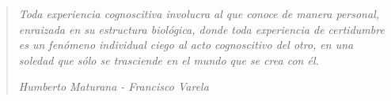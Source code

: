 \thispagestyle{empty}
\vspace*{\fill}
\begin{quote}
	\raggedleft
	\emph{Toda experiencia cognoscitiva involucra al que conoce de manera personal, enraizada en su estructura biológica, donde toda experiencia de certidumbre es un fenómeno individual ciego al acto cognoscitivo del otro, en una soledad que sólo se trasciende en el mundo que se crea con él.}
	
	\bigskip
	\emph{Humberto Maturana - Francisco Varela}
\end{quote}
\vspace*{\fill}


